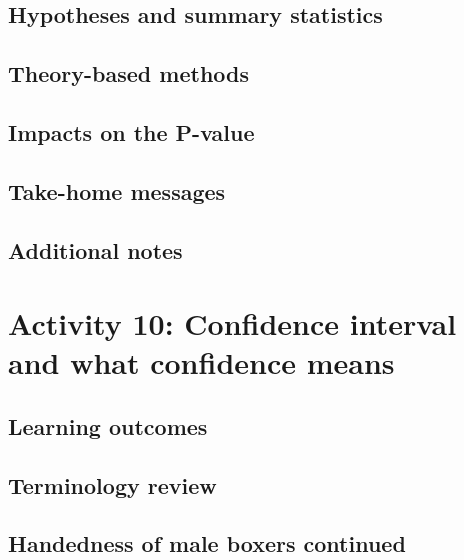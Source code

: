\documentclass[
]{report}
\begin{document}
\subsection*{Hypotheses and summary statistics}\label{hypotheses-and-summary-statistics}

\subsection*{Theory-based methods}\label{theory-based-methods-1}

\subsection*{Impacts on the P-value}\label{impacts-on-the-p-value}

\subsection{Take-home messages}\label{take-home-messages-8}

\subsection{Additional notes}\label{additional-notes-8}

\section{Activity 10: Confidence interval and what confidence means}\label{activity-10-confidence-interval-and-what-confidence-means}

\subsection{Learning outcomes}\label{learning-outcomes-9}

\subsection{Terminology review}\label{terminology-review-8}

\subsection{Handedness of male boxers continued}\label{handedness-of-male-boxers-continued}
\end{document}
